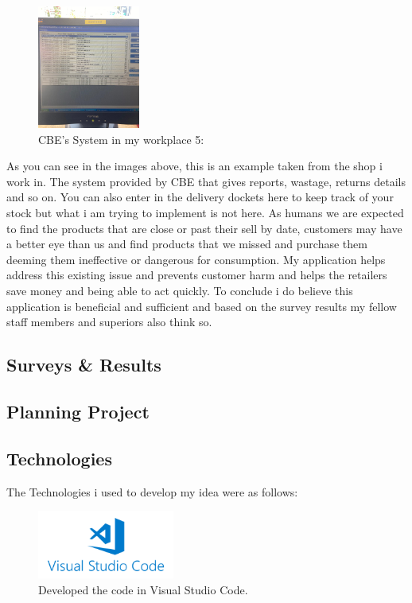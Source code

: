 \begin{figure}[h!]
	\caption{CBE's System in my workplace 5:}
	\label{image:mace5}
	\centering
	\includegraphics[width=0.3\textwidth]{images/mace5.PNG}
\end{figure}
\newpage
As you can see in the images above, this is an example taken from the shop i work in. The system provided by CBE that gives reports, wastage, returns details and so on. You can also enter in the delivery dockets here to keep track of your stock but what i am trying to implement is not here. As humans we are expected to find the products that are close or past their sell by date, customers may have a better eye than us and find products that we missed and purchase them deeming them ineffective or dangerous for consumption. My application helps address this existing issue and prevents customer harm and helps the retailers save money and being able to act quickly. To conclude i do believe this application is beneficial and sufficient and based on the survey results my fellow staff members and superiors also think so. 

\subsection{Surveys \& Results}

\subsection{Planning Project}

\subsection{Technologies}
The Technologies i used to develop my idea were as follows:
\newline

\begin{figure}[h!]
	\caption{Developed the code in Visual Studio Code.}
	\label{image:vscode}
	\centering
	\includegraphics[width=0.4\textwidth]{images/vscode.png}
\end{figure}

